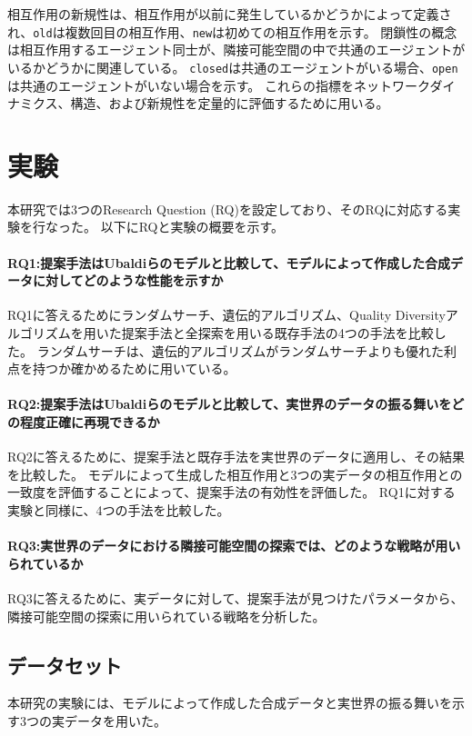 \documentclass[uplatex,11pt,openany]{ujreport}
\begin{document}
        相互作用の新規性は、相互作用が以前に発生しているかどうかによって定義され、\verb|old|は複数回目の相互作用、\verb|new|は初めての相互作用を示す。
        閉鎖性の概念は相互作用するエージェント同士が、隣接可能空間の中で共通のエージェントがいるかどうかに関連している。
        \verb|closed|は共通のエージェントがいる場合、\verb|open|は共通のエージェントがいない場合を示す。
        これらの指標をネットワークダイナミクス、構造、および新規性を定量的に評価するために用いる。


\chapter{実験}
    本研究では3つのResearch Question (RQ)を設定しており、そのRQに対応する実験を行なった。
    以下にRQと実験の概要を示す。
        \subsubsection*{RQ1:提案手法はUbaldiらのモデルと比較して、モデルによって作成した合成データに対してどのような性能を示すか}
            RQ1に答えるためにランダムサーチ、遺伝的アルゴリズム、Quality Diversityアルゴリズムを用いた提案手法と全探索を用いる既存手法の4つの手法を比較した。
            ランダムサーチは、遺伝的アルゴリズムがランダムサーチよりも優れた利点を持つか確かめるために用いている。
        \subsubsection*{RQ2:提案手法はUbaldiらのモデルと比較して、実世界のデータの振る舞いをどの程度正確に再現できるか}
            RQ2に答えるために、提案手法と既存手法を実世界のデータに適用し、その結果を比較した。
            モデルによって生成した相互作用と3つの実データの相互作用との一致度を評価することによって、提案手法の有効性を評価した。
            RQ1に対する実験と同様に、4つの手法を比較した。
        \subsubsection*{RQ3:実世界のデータにおける隣接可能空間の探索では、どのような戦略が用いられているか}
            RQ3に答えるために、実データに対して、提案手法が見つけたパラメータから、隣接可能空間の探索に用いられている戦略を分析した。

    \section{データセット}
        本研究の実験には、モデルによって作成した合成データと実世界の振る舞いを示す3つの実データを用いた。
\end{document}
